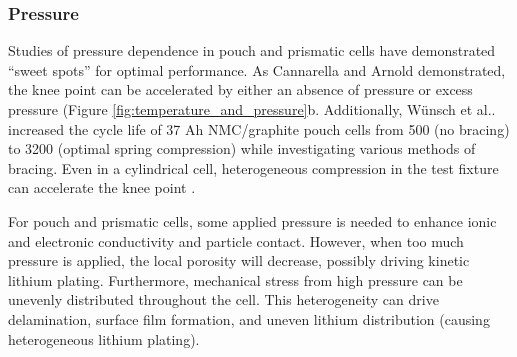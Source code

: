 \documentclass[journal=jpclcd,manuscript=article]{achemso}
\begin{document}
\subsubsection{Pressure}
Studies of pressure dependence in pouch and prismatic cells have demonstrated ``sweet spots'' for optimal performance. As Cannarella and Arnold\cite{cannarella_stress_2014} demonstrated, the knee point can be accelerated by either an absence of pressure or excess pressure (Figure \ref{fig:temperature_and_pressure}b.
Additionally, Wünsch et al.\cite{wunsch_investigation_2019}. increased the cycle life of 37 Ah NMC/graphite pouch cells from 500 (no bracing) to 3200 (optimal spring compression) while investigating various methods of bracing.
Even in a cylindrical cell, heterogeneous compression in the test fixture can accelerate the knee point \cite{bach_nonlinear_2016}. 

For pouch and prismatic cells, some applied pressure is needed to enhance ionic and electronic conductivity and particle contact. However, when too much pressure is applied, the local porosity will decrease, possibly driving kinetic lithium plating.
Furthermore, mechanical stress from high pressure can be unevenly distributed throughout the cell. This heterogeneity can drive delamination, surface film formation, and uneven lithium distribution (causing heterogeneous lithium plating).
\end{document}
